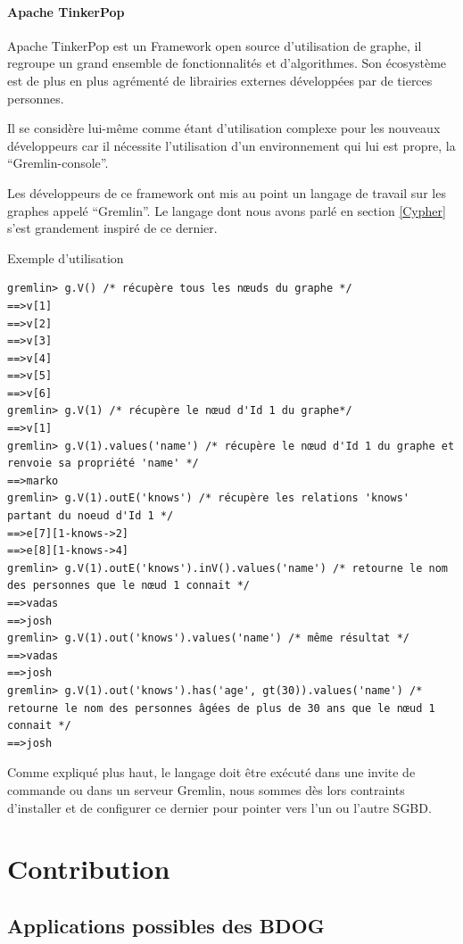 \documentclass[a4paper,fleqn,12pt]{report}
\begin{document}
\subsection{Apache TinkerPop}

Apache TinkerPop est un Framework open source d’utilisation de graphe, il regroupe un grand ensemble de fonctionnalités et d’algorithmes. Son écosystème est de plus en plus agrémenté de librairies externes développées par de tierces personnes.

Il se considère lui-même comme étant d’utilisation complexe pour les nouveaux développeurs car il nécessite l’utilisation d’un environnement qui lui est propre, la \enquote{Gremlin-console}.

Les développeurs de ce framework ont mis au point un langage de travail sur les graphes appelé \enquote{Gremlin}. Le langage dont nous avons parlé en section \ref{Cypher} s’est grandement inspiré de ce dernier.\cite{tinkerPopSite}

Exemple d’utilisation

\begin{lstlisting}
gremlin> g.V() /* récupère tous les nœuds du graphe */
==>v[1]
==>v[2]
==>v[3]
==>v[4]
==>v[5]
==>v[6]
gremlin> g.V(1) /* récupère le nœud d'Id 1 du graphe*/
==>v[1]
gremlin> g.V(1).values('name') /* récupère le nœud d'Id 1 du graphe et renvoie sa propriété 'name' */
==>marko
gremlin> g.V(1).outE('knows') /* récupère les relations 'knows' partant du noeud d'Id 1 */
==>e[7][1-knows->2]
==>e[8][1-knows->4]
gremlin> g.V(1).outE('knows').inV().values('name') /* retourne le nom des personnes que le nœud 1 connait */
==>vadas
==>josh
gremlin> g.V(1).out('knows').values('name') /* même résultat */
==>vadas
==>josh
gremlin> g.V(1).out('knows').has('age', gt(30)).values('name') /* retourne le nom des personnes âgées de plus de 30 ans que le nœud 1 connait */
==>josh
\end{lstlisting}

Comme expliqué plus haut, le langage doit être exécuté dans une invite de commande ou dans un serveur Gremlin, nous sommes dès lors contraints d’installer et de configurer ce dernier pour pointer vers l’un ou l’autre SGBD.



\part{Contribution}
\chapter{Applications possibles des BDOG}
\end{document}
